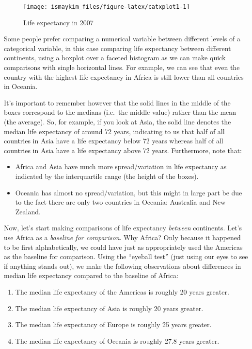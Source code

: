 \documentclass[12pt, krantz2,]{krantz}
\providecommand{\tightlist}{%
  \setlength{\itemsep}{0pt}\setlength{\parskip}{0pt}}
\begin{document}
\begin{figure}

{\centering \texttt{[image: ismaykim\_files/figure-latex/catxplot1-1]} 

}

\caption{Life expectancy in 2007}\label{fig:catxplot1}
\end{figure}

Some people prefer comparing a numerical variable between different levels of a categorical variable, in this case comparing life expectancy between different continents, using a boxplot over a faceted histogram as we can make quick comparisons with single horizontal lines. For example, we can see that even the country with the highest life expectancy in Africa is still lower than all countries in Oceania.

It's important to remember however that the solid lines in the middle of the boxes correspond to the medians (i.e.~the middle value) rather than the mean (the average). So, for example, if you look at Asia, the solid line denotes the median life expectancy of around 72 years, indicating to us that half of all countries in Asia have a life expectancy below 72 years whereas half of all countries in Asia have a life expectancy above 72 years. Furthermore, note that:

\begin{itemize}
\tightlist
\item
  Africa and Asia have much more spread/variation in life expectancy as indicated by the interquartile range (the height of the boxes).
\item
  Oceania has almost no spread/variation, but this might in large part be due to the fact there are only two countries in Oceania: Australia and New Zealand.
\end{itemize}

Now, let's start making comparisons of life expectancy \emph{between} continents. Let's use Africa as a \emph{baseline for comparison}. Why Africa? Only because it happened to be first alphabetically, we could have just as appropriately used the Americas as the baseline for comparison. Using the ``eyeball test'' (just using our eyes to see if anything stands out), we make the following observations about differences in median life expectancy compared to the baseline of Africa:

\begin{enumerate}
\def\labelenumi{\arabic{enumi}.}
\tightlist
\item
  The median life expectancy of the Americas is roughly 20 years greater.
\item
  The median life expectancy of Asia is roughly 20 years greater.
\item
  The median life expectancy of Europe is roughly 25 years greater.
\item
  The median life expectancy of Oceania is roughly 27.8 years greater.
\end{enumerate}
\end{document}

